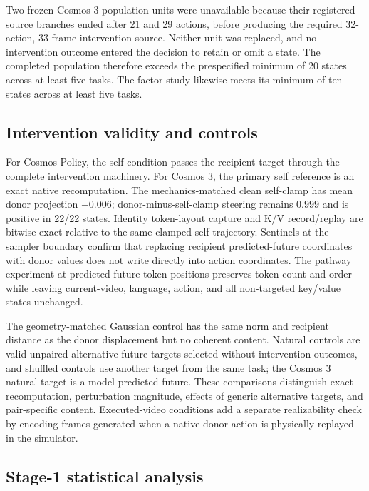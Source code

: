 \documentclass{article}
\begin{document}
Two frozen Cosmos 3 population units were unavailable because their registered source branches ended after 21 and 29 actions, before producing the required 32-action, 33-frame intervention source. Neither unit was replaced, and no intervention outcome entered the decision to retain or omit a state. The completed population therefore exceeds the prespecified minimum of 20 states across at least five tasks. The factor study likewise meets its minimum of ten states across at least five tasks.

\subsection{Intervention validity and controls}
\label{app:controls}

For Cosmos Policy, the self condition passes the recipient target through the complete intervention machinery. For Cosmos 3, the primary self reference is an exact native recomputation. The mechanics-matched clean self-clamp has mean donor projection $-0.006$; donor-minus-self-clamp steering remains $0.999$ and is positive in 22/22 states. Identity token-layout capture and K/V record/replay are bitwise exact relative to the same clamped-self trajectory. Sentinels at the sampler boundary confirm that replacing recipient predicted-future coordinates with donor values does not write directly into action coordinates. The pathway experiment at predicted-future token positions preserves token count and order while leaving current-video, language, action, and all non-targeted key/value states unchanged.

The geometry-matched Gaussian control has the same norm and recipient distance as the donor displacement but no coherent content. Natural controls are valid unpaired alternative future targets selected without intervention outcomes, and shuffled controls use another target from the same task; the Cosmos 3 natural target is a model-predicted future. These comparisons distinguish exact recomputation, perturbation magnitude, effects of generic alternative targets, and pair-specific content. Executed-video conditions add a separate realizability check by encoding frames generated when a native donor action is physically replayed in the simulator.

\subsection{Stage-1 statistical analysis}
\label{app:stage1_stats}
\end{document}
